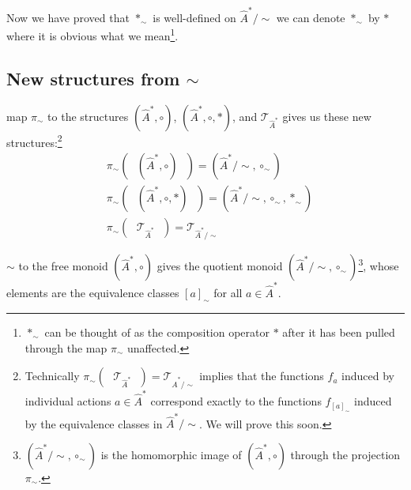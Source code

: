 \begin{notation}
    Now we have proved that $\ast_{\sim}$ is well-defined on $\hat{A}^{*}/\sim$ we can denote $\ast_{\sim}$ by $\ast$ where it is obvious what we mean\footnote{
    $\ast_{\sim}$ can be thought of as the composition operator $\ast$ after it has been pulled through the map $\pi_{\sim}$ unaffected.
    }.
\end{notation}


\subsection{New structures from $\sim$}

 map $\pi_{\sim}$ to the structures $(\hat{A}^{*}, \circ)$, $(\hat{A}^{*}, \circ, \ast)$, and $\mathcal{T}_{\hat{A}^{*}}$ gives us these new structures:\footnote{
    Technically $\pi_{\sim}(\text{ }\mathcal{T}_{\hat{A}^{*}}\text{ }) = \mathcal{T}_{\hat{A}^{*}/\sim}$ implies that the functions $f_{a}$ induced by individual actions $a \in \hat{A}^{*}$ correspond exactly to the functions $f_{[a]_{\sim}}$ induced by the equivalence classes in $\hat{A}^{*}/\sim$.
    We will prove this soon.
}
\begin{align}
	 & \pi_{\sim}(\text{ }(\hat{A}^{*}, \circ)\text{ }) = (\hat{A}^{*}/\sim, \circ_{\sim})                    \\
	 & \pi_{\sim}(\text{ }(\hat{A}^{*}, \circ, \ast)\text{ }) = (\hat{A}^{*}/\sim, \circ_{\sim}, \ast_{\sim}) \\
	 & \pi_{\sim}(\text{ }\mathcal{T}_{\hat{A}^{*}}\text{ }) = \mathcal{T}_{\hat{A}^{*}/\sim}
\end{align}


 $\sim$ to the free monoid $(\hat{A}^{*}, \circ)$ gives the quotient monoid $(\hat{A}^{*}/\sim, \circ_{\sim})$\footnote{
	$(\hat{A}^{*}/\sim, \circ_{\sim})$ is the homomorphic image of $(\hat{A}^{*}, \circ)$ through the projection $\pi_{\sim}$.
}, whose elements are the equivalence classes $[a]_{\sim}$ for all $a \in \hat{A}^{*}$.

